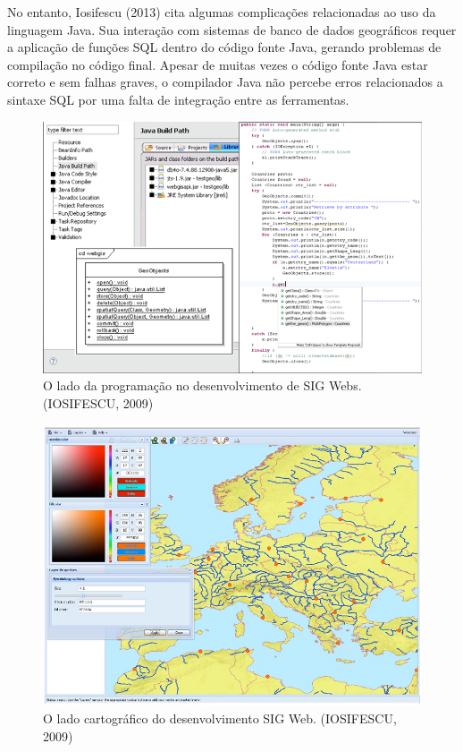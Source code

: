 		No entanto, Iosifescu (2013) cita algumas complicações relacionadas ao uso da linguagem Java. Sua interação com sistemas de banco de dados geográficos requer a aplicação de funções SQL dentro do código fonte Java, gerando problemas de compilação no código final. Apesar de muitas vezes o código fonte Java estar correto e sem falhas graves, o compilador Java não percebe erros relacionados a sintaxe SQL por uma falta de integração entre as ferramentas.
		
		\begin{figure}
			\centering
			\includegraphics[width=1\linewidth]{data/sigweb_developer_side}
			\caption{O lado da programação no desenvolvimento de SIG Webs. (IOSIFESCU, 2009)}
			\label{fig:sigwebdeveloperside}
		\end{figure}
	
		\begin{figure}
			\centering
			\includegraphics[width=1\linewidth]{data/sigweb_cartografico_side}
			\caption{O lado cartográfico do desenvolvimento SIG Web. (IOSIFESCU, 2009)}
			\label{fig:sigwebcartograficoside}
		\end{figure}
		
